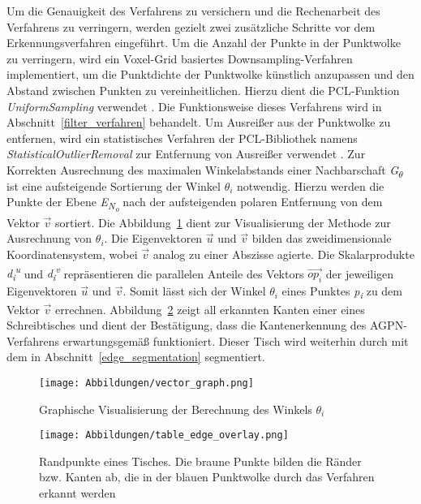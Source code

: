 Um die Genauigkeit des Verfahrens zu versichern und die Rechenarbeit des Verfahrens zu verringern, werden gezielt zwei zusätzliche Schritte vor dem Erkennungsverfahren eingeführt. Um die Anzahl der Punkte in der Punktwolke zu verringern, wird ein Voxel-Grid basiertes Downsampling-Verfahren implementiert, um die Punktdichte der Punktwolke künstlich anzupassen und den Abstand zwischen Punkten zu vereinheitlichen. Hierzu dient die PCL-Funktion \textit{UniformSampling} verwendet \autocite{noauthor_point_2023}. Die Funktionsweise dieses Verfahrens wird in Abschnitt~\ref{filter_verfahren} behandelt. Um Ausreißer aus der Punktwolke zu entfernen, wird ein statistisches Verfahren der PCL-Bibliothek namens \textit{StatisticalOutlierRemoval} zur Entfernung von Ausreißer verwendet \autocite{rusu_towards_2008}. Zur Korrekten Ausrechnung des maximalen Winkelabstands einer Nachbarschaft \textit{G\textsubscript{$\theta$}} ist eine aufsteigende Sortierung der Winkel \textit{$\theta_i$} notwendig. Hierzu werden die Punkte der Ebene \textit{E\textsubscript{N\textsubscript{o}}} nach der aufsteigenden polaren Entfernung von dem Vektor $\vec{v}$ sortiert. Die Abbildung~\ref{vector_graph} dient zur Visualisierung der Methode zur Ausrechnung von $\theta_i$. Die Eigenvektoren $\vec{u}$ und $\vec{v}$ bilden das zweidimensionale Koordinatensystem, wobei $\vec{v}$ analog zu einer Abszisse agierte. Die Skalarprodukte \textit{d\textsubscript{i}\textsuperscript{u}} und \textit{d\textsubscript{i}\textsuperscript{v}} repräsentieren die parallelen Anteile des Vektors $\overrightarrow{{op}_i}$ der jeweiligen Eigenvektoren $\vec{u}$ und $\vec{v}$. Somit lässt sich der Winkel $\theta_i$ eines Punktes \textit{p\textsubscript{i}} zu dem Vektor $\vec{v}$ errechnen. Abbildung~\ref{edge_points_table} zeigt all erkannten Kanten einer eines Schreibtisches und dient der Bestätigung, dass die Kantenerkennung des AGPN-Verfahrens erwartungsgemäß funktioniert. Dieser Tisch wird weiterhin durch mit dem in Abschnitt~\ref{edge_segmentation} segmentiert.

\begin{figure}[h]
	\texttt{[image: Abbildungen/vector\_graph.png]}
	\centering
	\caption[Berechnung des Winkels zwischen Punkte]{Graphische Visualisierung der Berechnung des Winkels $\theta_i$}
	\label{vector_graph}
\end{figure}

\begin{figure}[h]
	\texttt{[image: Abbildungen/table\_edge\_overlay.png]}
	\centering
	\caption[Randpunkte eines Tisches]{Randpunkte eines Tisches. Die braune Punkte bilden die Ränder bzw. Kanten ab, die in der blauen Punktwolke durch das Verfahren erkannt werden}
	\label{edge_points_table}
\end{figure}

